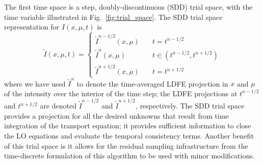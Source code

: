 \documentclass{anstrans}
\begin{document}
The first time space is a step, doubly-discontinuous (SDD) trial
space, with the time variable illustrated in Fig.~\ref{fig:trial_space}.  The SDD trial space
representation for $I(x,\mu,t)$ is
\begin{equation}\label{eq:time_space}
    \tilde I(x,\mu,t) = \left \{ \begin{array}{cl}
        \tilde I^{n-1/2}(x,\mu)  & \quad t = t^{n-1/2} \\ 
        \tilde I^n(x,\mu)  & \quad t \in (t^{n-1/2},t^{n+1/2}) \\               
      \tilde I^{n+1/2}(x,\mu)   &  \quad        t = t^{n+1/2}
    \end{array}           \right.
\end{equation}
where we have used $\tilde I^n$ to denote the time-averaged LDFE projection in $x$
and $\mu$ of the intensity over the interior of the time step;  the LDFE projections at
$t^{n-1/2}$ and $t^{n+1/2}$ are denoted $\tilde I^{n-1/2}$ and $\tilde I^{n+1/2}$, respectively.
The SDD trial space provides a projection for all the desired unknowns that result from time integration of the transport
equation; it provides sufficient information to close the LO equations and evaluate the temporal consistency
terms. Another benefit of this
trial space is it allows for the residual sampling infrastructure from the
time-discrete formulation of this algorithm to be used with minor modifications.
\end{document}
